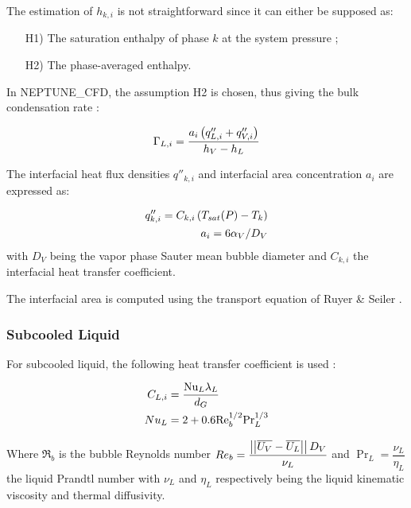 The estimation of $h_{k,i}$ is not straightforward since it can either be supposed as:

\begin{enumerate}
\item[H1)] The saturation enthalpy of phase $k$ at the system pressure ;
\item[H2)] The phase-averaged enthalpy.
\end{enumerate}

\npar
In NEPTUNE\_CFD, the assumption H2 is chosen, thus giving the bulk condensation rate :

\begin{equation}
\Gamma_{L,i}=\frac{a_{i}\left( q''_{L,i}+q''_{V,i} \right)}{h_{V}-h_{L}}
\label{eq:ncfd_cond_rate}
\end{equation}


The interfacial heat flux densities $q''_{k,i}$ and interfacial area concentration $a_{i}$ are expressed as:

\begin{align}
q''_{k,i}=C_{k,i}\left( T_{sat}(P)-T_{k} \right)\\
a_{i}=6 \alpha_{V}/D_{V}
\end{align}
with $D_{V}$ being the vapor phase Sauter mean bubble diameter and $C_{k,i}$ the interfacial heat transfer coefficient.

\npar

\begin{note*}{}
The interfacial area is computed using the transport equation of {Ruyer} \& {Seiler} \cite{ruyer_modelisation_2009}.
\end{note*}


\subsubsection{Subcooled Liquid}

For subcooled liquid, the following heat transfer coefficient is used \cite{ranz_evaporation_1952, manon_contribution_2000}:

\begin{align}
C_{L,i}&=\frac{\Nu_{L}\lambda_{L}}{d_{G}}\\
%
Nu_{L}&=2+0.6\Re_{b}^{1/2}\Pr_{L}^{1/3}
\label{eq:ncfd_subcooled_L}
\end{align}

Where $\Re_{b}$ is the bubble Reynolds number $Re_{b}=\dfrac{\left|\left|{\overline{U_{V}}-\overline{U_{L}}}\right|\right|D_{V} }{\nu_{L}}$ and $\Pr_{L}=\dfrac{\nu_{L}}{\eta_{L}}$ the liquid Prandtl number with $\nu_{L}$ and $\eta_{L}$ respectively being the liquid kinematic viscosity and thermal diffusivity.


